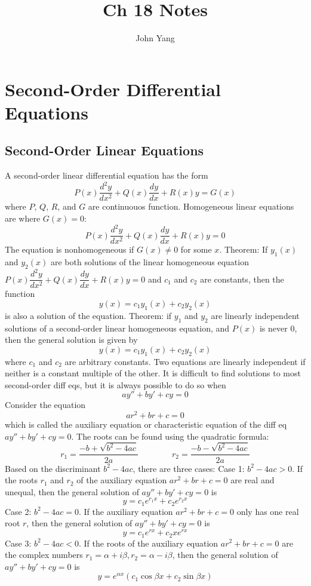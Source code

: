 \documentclass{article}
\title{Ch 18 Notes} %
\author{John Yang}
\begin{document}
    \maketitle
    \tableofcontents
    \section{Second-Order Differential Equations} %
    \subsection{Second-Order Linear Equations}
    \begin{outline}
        \1 A second-order linear differential equation has the form \[P(x)\dfrac{d^2y}{dx^2}+Q(x)\dfrac{dy}{dx}+R(x)y=G(x)\] where \(P\), \(Q\), \(R\), and \(G\) are continuouos function. 
        \1 Homogeneous linear equations are where \(G(x)=0\): \[P(x)\dfrac{d^2y}{dx^2}+Q(x)\dfrac{dy}{dx}+R(x)y=0\] The equation is nonhomogeneous if \(G(x)\neq 0\) for some $x$. 
        \1 Theorem: If \(y_1(x)\) and \(y_2(x)\) are both solutions of the linear homogeneous equation \(P(x)\dfrac{d^2y}{dx^2}+Q(x)\dfrac{dy}{dx}+R(x)y=0\) and \(c_1\) and \(c_2\) are constants, then the function \[y(x)=c_1y_1(x)+c_2y_2(x)\] is also a solution of the equation. 
        \1 Theorem: if \(y_1\) and \(y_2\) are linearly independent solutions of a second-order linear homogeneous equation, and \(P(x)\) is never \(0\), then the general solution is given by \[y(x)=c_1y_1(x)+c_2y_2(x)\] where \(c_1\) and \(c_2\) are arbitrary constants. 
        \1 Two equations are linearly independent if neither is a constant multiple of the other. 
        \1 It is difficult to find solutions to most second-order diff eqs, but it is always possible to do so when \[ay''+by'+cy=0\]
        \1 Consider the equation \[ar^2+br+c=0\] which is called the auxiliary equation or characteristic equation of the diff eq \(ay''+by'+cy=0\). The roots can be found using the quadratic formula: \[r_1=\dfrac{-b+\sqrt{b^2-4ac}}{2a}\qquad\qquad r_2=\dfrac{-b-\sqrt{b^2-4ac}}{2a}\]
        \1 Based on the discriminant \(b^2-4ac\), there are three cases: 
            \2 Case 1: \(b^2-4ac>0\). If the roots $r_1$ and $r_2$ of the auxiliary equation \(ar^2+br+c=0\) are real and unequal, then the general solution of \(ay''+by'+cy=0\) is \[y=c_1e^{r_1x}+c_2e^{r_2x}\]
            \2 Case 2: \(b^2-4ac=0\). If the auxiliary equation \(ar^2+br+c=0\) only has one real root $r$, then the general solution of \(ay''+by'+cy=0\) is \[y=c_1e^{rx}+c_2xe^{rx}\]
            \2 Case 3: \(b^2-4ac<0\). If the roots of the auxiliary equation \(ar^2+br+c=0\) are the complex numbers \(r_1=\alpha+i\beta,r_2=\alpha-i\beta\), then the general solution of \(ay''+by'+cy=0\) is \[y=e^{\alpha x}(c_1\cos\beta x+c_2\sin\beta x)\]
    \end{outline}
\end{document}
